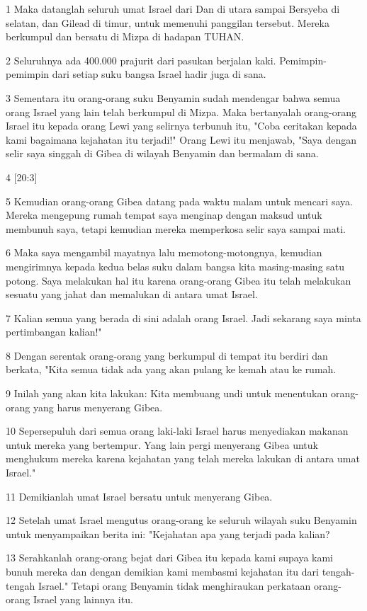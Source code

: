 \par 1 Maka datanglah seluruh umat Israel dari Dan di utara sampai Bersyeba di selatan, dan Gilead di timur, untuk memenuhi panggilan tersebut. Mereka berkumpul dan bersatu di Mizpa di hadapan TUHAN.
\par 2 Seluruhnya ada 400.000 prajurit dari pasukan berjalan kaki. Pemimpin-pemimpin dari setiap suku bangsa Israel hadir juga di sana.
\par 3 Sementara itu orang-orang suku Benyamin sudah mendengar bahwa semua orang Israel yang lain telah berkumpul di Mizpa. Maka bertanyalah orang-orang Israel itu kepada orang Lewi yang selirnya terbunuh itu, "Coba ceritakan kepada kami bagaimana kejahatan itu terjadi!" Orang Lewi itu menjawab, "Saya dengan selir saya singgah di Gibea di wilayah Benyamin dan bermalam di sana.
\par 4 [20:3]
\par 5 Kemudian orang-orang Gibea datang pada waktu malam untuk mencari saya. Mereka mengepung rumah tempat saya menginap dengan maksud untuk membunuh saya, tetapi kemudian mereka memperkosa selir saya sampai mati.
\par 6 Maka saya mengambil mayatnya lalu memotong-motongnya, kemudian mengirimnya kepada kedua belas suku dalam bangsa kita masing-masing satu potong. Saya melakukan hal itu karena orang-orang Gibea itu telah melakukan sesuatu yang jahat dan memalukan di antara umat Israel.
\par 7 Kalian semua yang berada di sini adalah orang Israel. Jadi sekarang saya minta pertimbangan kalian!"
\par 8 Dengan serentak orang-orang yang berkumpul di tempat itu berdiri dan berkata, "Kita semua tidak ada yang akan pulang ke kemah atau ke rumah.
\par 9 Inilah yang akan kita lakukan: Kita membuang undi untuk menentukan orang-orang yang harus menyerang Gibea.
\par 10 Sepersepuluh dari semua orang laki-laki Israel harus menyediakan makanan untuk mereka yang bertempur. Yang lain pergi menyerang Gibea untuk menghukum mereka karena kejahatan yang telah mereka lakukan di antara umat Israel."
\par 11 Demikianlah umat Israel bersatu untuk menyerang Gibea.
\par 12 Setelah umat Israel mengutus orang-orang ke seluruh wilayah suku Benyamin untuk menyampaikan berita ini: "Kejahatan apa yang terjadi pada kalian?
\par 13 Serahkanlah orang-orang bejat dari Gibea itu kepada kami supaya kami bunuh mereka dan dengan demikian kami membasmi kejahatan itu dari tengah-tengah Israel." Tetapi orang Benyamin tidak menghiraukan perkataan orang-orang Israel yang lainnya itu.
